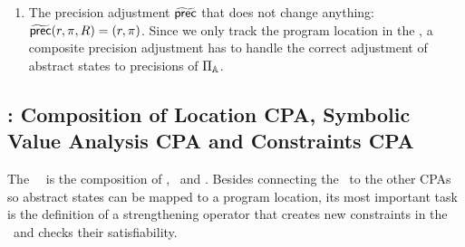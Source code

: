 \begin{enumerate}[leftmargin=*,label=\arabic*.]
\item
The precision adjustment $\operatorname{\widetilde{\operatorname{\operatorname{\mathsf{prec}}}}}$ that does not change anything: $\operatorname{\widetilde{\operatorname{\operatorname{\mathsf{prec}}}}}(r, \pi, R) = (r, \pi)$.
Since we only track the program location in the \locationCPA, a composite precision adjustment has to handle the correct adjustment of abstract states to precisions of $\Pi_{\mathbb{A}}$.

\end{enumerate}


\subsection{\SymbolicExecutionCPA : Composition of Location CPA, Symbolic Value Analysis CPA and Constraints CPA}
The \symbolicExecutionCPA\ \cite{Lemberger2015}\ is the composition of \locationCPA, \symbolicValueAnalysisCPA\ and \constraintsCPA.
Besides connecting the \locationCPA\ to the other CPAs so abstract states can be mapped to a program location, its most important task is the definition of a strengthening operator that creates new constraints in the \constraintsCPA\ and checks their satisfiability.


